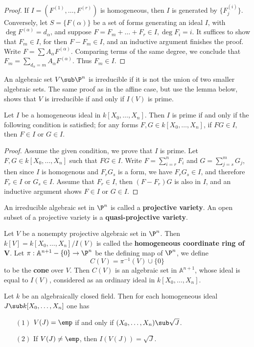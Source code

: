 \begin{proof}
If $I=(F^{(1)},\dots,F^{(r)})$ is homogeneous, then $I$ is generated by $\{F^{(i)}_j\}$. Conversely, let $S=\{F(\alpha)\}$ be a set of forms generating an ideal $I$, with $\deg F^{(\alpha)}=d_\alpha$, and suppose $F=F_m+\dots+F_r\in I,\deg F_i=i$. It suffices to show that $F_m\in I$, for then $F-F_m\in I$, and an inductive argument finishes the proof. Write $F=\sum A_\alpha F^{(\alpha)}$. Comparing terms of the same degree, we conclude that$F_m=\sum_{d_\alpha=m}A_\alpha F^{(\alpha)}$. Thus $F_m\in I$.
\end{proof}
An algebraic set $V\sub\P^n$ is irreducible if it is not the union of two smaller algebraic sets. The same proof as in the affine case, but use the lemma below, shows that $V$ is irreducible if and only if $I(V)$ is prime.
\begin{lemma}
Let $I$ be a homogeneous ideal in $k[X_0,\dots,X_n]$. Then $I$ is prime if and only if the following condition is satisfied; for any forms $F,G\in k[X_0,\dots,X_n]$, if $FG\in I$, then $F\in I$ or $G\in I$.
\end{lemma}
\begin{proof}
Assume the given condition, we prove that $I$ is prime. Let $F,G\in k[X_0,\dots,X_n]$ such that $FG\in I$. Write $F=\sum_{i=r}^{n}F_i$ and $G=\sum_{j=s}^{m}G_j$, then since $I$ is homogenous and $F_rG_s$ is a form, we have $F_rG_s\in I$, and therefore $F_r\in I$ or $G_s\in I$. Assume that $F_r\in I$, then $(F-F_r)G$ is also in $I$, and an inductive argument shows $F\in I$ or $G\in I$.
\end{proof}
\begin{definition}
An irreducible algebraic set in $\P^n$ is called a \textbf{projective variety}. An open subset of a projective variety is a \textbf{quasi-projective variety}.
\end{definition}
Let $V$ be a nonempty projective algebraic set in $\P^n$. Then $k[V]=k[X_0,\dots,X_n]/I(V)$ is called the \textbf{homogeneous coordinate ring of $\bm{V}$}. Let $\pi:\mathbb{A}^{n+1}-\{0\}\to\P^n$ be the defining map of $\P^n$, we define
\[C(V)=\pi^{-1}(V)\cup\{0\}\]
to be the \textbf{cone} over $V$. Then $C(V)$ is an algebraic set in $\mathbb{A}^{n+1}$, whose ideal is equal to $I(V)$, considered as an ordinary ideal in $k[X_0,\dots,X_n]$.
\begin{theorem}
Let $k$ be an algebraically closed field. Then for each homogeneous ideal $J\sub k[X_0,\dots,X_n]$ one has
\begin{itemize}
\item[$(1)$] $V(J)=\emp$ if and only if $(X_0,\dots,X_n)\sub\sqrt{J}$.
\item[$(2)$] If $V(J)\neq\emp$, then $I(V(J))=\sqrt{J}$.
\end{itemize}
\end{theorem}
